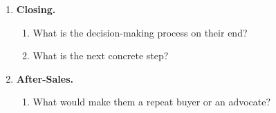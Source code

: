 \begin{enumerate}
    \item \textbf{Closing.}
    \begin{enumerate}
        \item What is the decision-making process on their end?
        \item What is the next concrete step?
    \end{enumerate}

    \item \textbf{After-Sales.}
    \begin{enumerate}
        \item What would make them a repeat buyer or an advocate?
    \end{enumerate}

\end{enumerate}